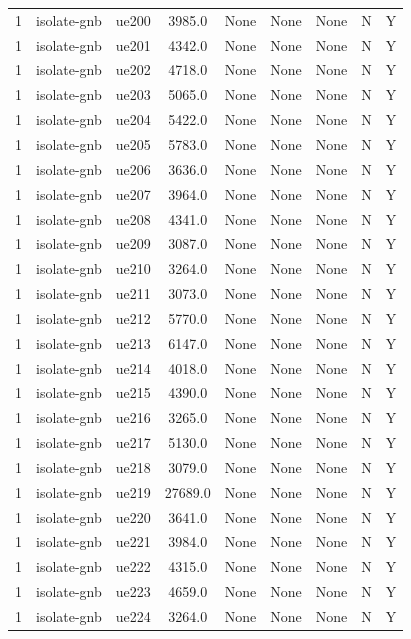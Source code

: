 \begin{table}[ht]
\begin{tabular}{|c|c|c|c|c|c|c|c|c|}
1 & isolate-gnb & ue200 & 3985.0 & None & None & None & N & Y \\
1 & isolate-gnb & ue201 & 4342.0 & None & None & None & N & Y \\
1 & isolate-gnb & ue202 & 4718.0 & None & None & None & N & Y \\
1 & isolate-gnb & ue203 & 5065.0 & None & None & None & N & Y \\
1 & isolate-gnb & ue204 & 5422.0 & None & None & None & N & Y \\
1 & isolate-gnb & ue205 & 5783.0 & None & None & None & N & Y \\
1 & isolate-gnb & ue206 & 3636.0 & None & None & None & N & Y \\
1 & isolate-gnb & ue207 & 3964.0 & None & None & None & N & Y \\
1 & isolate-gnb & ue208 & 4341.0 & None & None & None & N & Y \\
1 & isolate-gnb & ue209 & 3087.0 & None & None & None & N & Y \\
1 & isolate-gnb & ue210 & 3264.0 & None & None & None & N & Y \\
1 & isolate-gnb & ue211 & 3073.0 & None & None & None & N & Y \\
1 & isolate-gnb & ue212 & 5770.0 & None & None & None & N & Y \\
1 & isolate-gnb & ue213 & 6147.0 & None & None & None & N & Y \\
1 & isolate-gnb & ue214 & 4018.0 & None & None & None & N & Y \\
1 & isolate-gnb & ue215 & 4390.0 & None & None & None & N & Y \\
1 & isolate-gnb & ue216 & 3265.0 & None & None & None & N & Y \\
1 & isolate-gnb & ue217 & 5130.0 & None & None & None & N & Y \\
1 & isolate-gnb & ue218 & 3079.0 & None & None & None & N & Y \\
1 & isolate-gnb & ue219 & 27689.0 & None & None & None & N & Y \\
1 & isolate-gnb & ue220 & 3641.0 & None & None & None & N & Y \\
1 & isolate-gnb & ue221 & 3984.0 & None & None & None & N & Y \\
1 & isolate-gnb & ue222 & 4315.0 & None & None & None & N & Y \\
1 & isolate-gnb & ue223 & 4659.0 & None & None & None & N & Y \\
1 & isolate-gnb & ue224 & 3264.0 & None & None & None & N & Y \\

\end{tabular}
\end{table}
